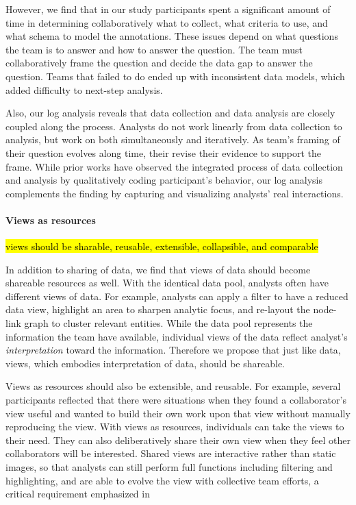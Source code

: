 However, we find that in our study participants spent a significant amount of time in determining collaboratively what to collect, what criteria to use, and what schema to model the annotations. These issues depend on what questions the team is to answer and how to answer the question. The team must collaboratively frame the question and decide the data gap to answer the question. Teams that failed to do ended up with inconsistent data models, which added difficulty to next-step analysis. 

Also, our log analysis reveals that data collection and data analysis are closely coupled along the process. Analysts do not work linearly from data collection to analysis, but work on both simultaneously and iteratively. As team's framing of their question evolves along time, their revise their evidence to support the frame. While prior works have observed the integrated process of data collection and analysis by qualitatively coding participant's behavior, our log analysis complements the finding by capturing and visualizing analysts' real interactions. 

\paragraph{Views as resources}

\hl{views should be sharable, reusable, extensible, collapsible, and comparable}

In addition to sharing of data, we find that views of data should become shareable resources as well. With the identical data pool, analysts often have different views of data. For example, analysts can apply a filter to have a reduced data view, highlight an area to sharpen analytic focus, and re-layout the node-link graph to cluster relevant entities. While the data pool represents the information the team have available, individual views of the data reflect analyst's \emph{interpretation} toward the information. Therefore we propose that just like data, views, which embodies interpretation of data, should be shareable. 

Views as resources should also be extensible, and reusable. For example, several participants reflected that there were situations when they found a collaborator's view useful and wanted to build their own work upon that view without manually reproducing the view. With views as resources, individuals can take the views to their need. They can also deliberatively share their own view when they feel other collaborators will be interested. Shared views are interactive rather than static images, so that analysts can still perform full functions including filtering and highlighting, and are able to evolve the view with collective team efforts, a critical requirement emphasized in \cite{Carroll2013}


